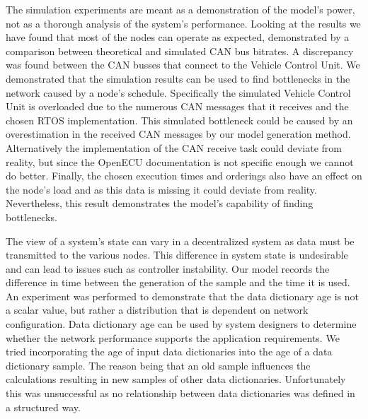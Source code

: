 The simulation experiments are meant as a demonstration of the model's power, not as a thorough analysis of the system's performance. Looking at the results we have found that most of the nodes can operate as expected, demonstrated by a comparison between theoretical and simulated CAN bus bitrates. A discrepancy was found between the CAN busses that connect to the Vehicle Control Unit. We demonstrated that the simulation results can be used to find bottlenecks in the network caused by a node's schedule. Specifically the simulated Vehicle Control Unit is overloaded due to the numerous CAN messages that it receives and the chosen RTOS implementation. This simulated bottleneck could be caused by an overestimation in the received CAN messages by our model generation method. Alternatively the implementation of the CAN receive task could deviate from reality, but since the OpenECU documentation is not specific enough we cannot do better. Finally, the chosen execution times and orderings also have an effect on the node's load and as this data is missing it could deviate from reality. Nevertheless, this result demonstrates the model's capability of finding bottlenecks.

The view of a system's state can vary in a decentralized system as data must be transmitted to the various nodes. This difference in system state is undesirable and can lead to issues such as controller instability. Our model records the difference in time between the generation of the sample and the time it is used. An experiment was performed to demonstrate that the data dictionary age is not a scalar value, but rather a distribution that is dependent on network configuration. Data dictionary age can be used by system designers to determine whether the network performance supports the application requirements. We tried incorporating the age of input data dictionaries into the age of a data dictionary sample. The reason being that an old sample influences the calculations resulting in new samples of other data dictionaries. Unfortunately this was unsuccessful as no relationship between data dictionaries was defined in a structured way.

